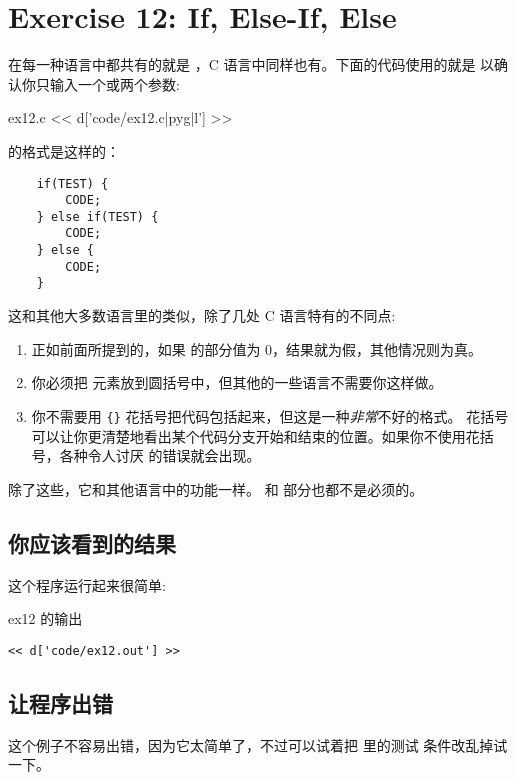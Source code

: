 \chapter{Exercise 12: If, Else-If, Else}

在每一种语言中都共有的就是 ，C 语言中同样也有。下面的代码使用的就是 
以确认你只输入一个或两个参数:

\begin{code}{ex12.c}
<< d['code/ex12.c|pyg|l'] >>
\end{code}

的格式是这样的：

\begin{Verbatim}
    if(TEST) {
        CODE;
    } else if(TEST) {
        CODE;
    } else {
        CODE;
    }
\end{Verbatim}

这和其他大多数语言里的类似，除了几处 C 语言特有的不同点:

\begin{enumerate}
\item 正如前面所提到的，如果  的部分值为 0，结果就为假，其他情况则为真。
\item 你必须把  元素放到圆括号中，但其他的一些语言不需要你这样做。
\item 你不需要用 \verb|{}| 花括号把代码包括起来，但这是一种\emph{非常}不好的格式。
花括号可以让你更清楚地看出某个代码分支开始和结束的位置。如果你不使用花括号，各种令人讨厌
的错误就会出现。
\end{enumerate}

除了这些，它和其他语言中的功能一样。 和  部分也都不是必须的。

\section{你应该看到的结果}

这个程序运行起来很简单:

\begin{code}{ex12 的输出}
\begin{lstlisting}
<< d['code/ex12.out'] >>
\end{lstlisting}
\end{code}

\section{让程序出错}
这个例子不容易出错，因为它太简单了，不过可以试着把  里的测试
条件改乱掉试一下。

